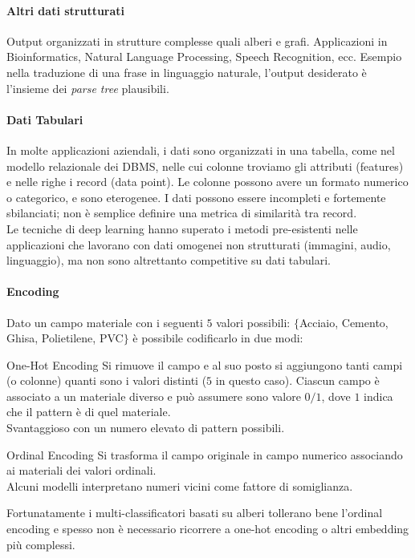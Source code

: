 \paragraph{Altri dati strutturati}\label{par:altri_dati_strutturati} %
Output organizzati in strutture complesse quali alberi e grafi.
Applicazioni in Bioinformatics, Natural Language Processing, Speech Recognition, ecc.
Esempio nella traduzione di una frase in linguaggio naturale, l'output desiderato è l'insieme dei \textit{parse tree} plausibili.
\paragraph{Dati Tabulari}\label{par:dati_tabulari} %
In molte applicazioni aziendali, i dati sono organizzati in una tabella, come nel modello relazionale dei DBMS, nelle cui colonne troviamo gli attributi (features) e nelle righe i record (data point).
Le colonne possono avere un formato numerico o categorico, e sono eterogenee.
I dati possono essere incompleti e fortemente sbilanciati; non è semplice definire una metrica di similarità tra record.
\\
Le tecniche di deep learning hanno superato i metodi pre-esistenti nelle applicazioni che lavorano con dati omogenei non strutturati (immagini, audio, linguaggio), ma non sono altrettanto competitive su dati tabulari.
\paragraph{Encoding}\label{par:encoding} %
Dato un campo materiale con i seguenti $5$ valori possibili: $\{$Acciaio, Cemento, Ghisa, Polietilene, PVC$\}$ è possibile codificarlo in due modi:
\begin{definition}{One-Hot Encoding}{}
    Si rimuove il campo e al suo posto si aggiungono tanti campi (o colonne) quanti sono i valori distinti ($5$ in questo caso).
    Ciascun campo è associato a un materiale diverso e può assumere sono valore $0/1$, dove $1$ indica che il pattern è di quel materiale.
    \\
    Svantaggioso con un numero elevato di pattern possibili.
\end{definition}
\begin{definition}{Ordinal Encoding}{}
    Si trasforma il campo originale in campo numerico associando ai materiali dei valori ordinali.
    \\
    Alcuni modelli interpretano numeri vicini come fattore di somiglianza.
\end{definition}
Fortunatamente i multi-classificatori basati su alberi tollerano bene l'ordinal encoding e spesso non è necessario ricorrere a one-hot encoding o altri embedding più complessi.
%
